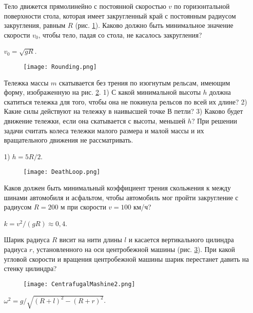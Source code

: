 \begin{ex} %
Тело движется прямолинейно с постоянной скоростью $v$ по горизонтальной поверхности стола, которая имеет закругленный край с постоянным радиусом закругления, равным $R$ (рис. \ref{Rounding}). Каково должно быть минимальное значение скорости $v_0$, чтобы тело, падая со стола, не касалось закругления?
\begin{ans}
$v_0 = \sqrt{gR}$.
\end{ans}
\end{ex}	

\begin{figure}[h]
\centering
\texttt{[image: Rounding.png]}
\caption{}
\label{Rounding}
\end{figure}

\begin{ex} %
Тележка массы $m$ скатывается без трения по изогнутым рельсам, имеющим форму, изображенную на рис. \ref{DeathLoop}. 1) С какой минимальной высоты $h$ должна скатиться тележка для того, чтобы она не покинула рельсов по всей их длине? 2) Какие силы действуют на тележку в наивысшей точке $В$ петли? 3) Каково будет движение тележки, если она скатывается с высоты, меньшей $h$? При решении задачи считать колеса тележки малого размера и малой массы и их вращательного движения не рассматривать.
\begin{ans}
1) $h=5R/2$.
\end{ans}
\end{ex}	

\begin{figure}[h]
\centering
\texttt{[image: DeathLoop.png]}
\caption{}
\label{DeathLoop}
\end{figure}

\begin{ex}  %
Каков должен быть минимальный коэффициент трения скольжения к между шинами автомобиля и асфальтом, чтобы автомобиль мог пройти закругление с радиусом $R = 200$ м при скорости $v = 100$ км/ч?
\begin{ans}
$k=v^2/(gR) \approx 0,4$.
\end{ans}
\end{ex}	

\begin{ex}  %
Шарик радиуса $R$ висит на нити длины $l$ и касается вертикального цилиндра радиуса $r$, установленного на оси центробежной машины (рис. \ref{CentrafugalMashine2}). При какой угловой скорости и вращения центробежной машины шарик перестанет давить на стенку цилиндра?

\begin{figure}[h]
\centering
\texttt{[image: CentrafugalMashine2.png]}
\caption{}
\label{CentrafugalMashine2}
\end{figure}

\begin{ans}
$\omega^2 = g/\sqrt{(R+l)^2-(R+r)^2}$.
\end{ans}
\end{ex}	

